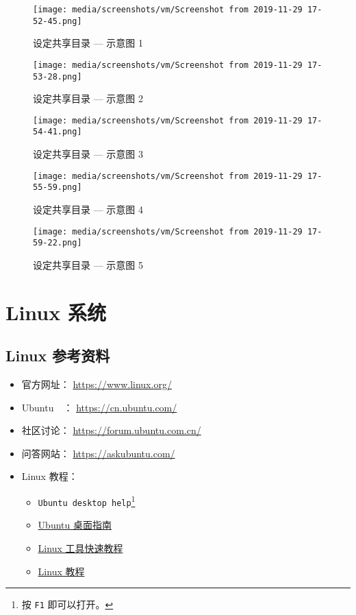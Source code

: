 \documentclass[
    11pt,
    base=hide,
    cite=authoryear,
    device=phone,
    lang=cn,
    mode=simple,
    result=answer,
    toc=onecol,
]{elegantbook_sierxue}
\begin{document}
\begin{figure}[!htbp]
  \centering
  \texttt{[image: media/screenshots/vm/Screenshot from 2019-11-29 17-52-45.png]}
  \caption{设定共享目录 --- 示意图 1}
\end{figure}
\begin{figure}[!htbp]
  \centering
  \texttt{[image: media/screenshots/vm/Screenshot from 2019-11-29 17-53-28.png]}
  \caption{设定共享目录 --- 示意图 2}
\end{figure}
\begin{figure}[!htbp]
  \centering
  \texttt{[image: media/screenshots/vm/Screenshot from 2019-11-29 17-54-41.png]}
  \caption{设定共享目录 --- 示意图 3}
\end{figure}
\begin{figure}[!htbp]
  \centering
  \texttt{[image: media/screenshots/vm/Screenshot from 2019-11-29 17-55-59.png]}
  \caption{设定共享目录 --- 示意图 4}
\end{figure}
\begin{figure}[!htbp]
  \centering
  \texttt{[image: media/screenshots/vm/Screenshot from 2019-11-29 17-59-22.png]}
  \caption{设定共享目录 --- 示意图 5}
\end{figure}

\section{Linux 系统}%
\label{sec:linux-a}

\subsection{Linux 参考资料}%
\label{sub:linux-refs}

\begin{itemize}
    \item 官方网址： \href{https://www.linux.org/}{https://www.linux.org/}
    \item Ubuntu~~： \href{https://cn.ubuntu.com/}{https://cn.ubuntu.com/}
    \item 社区讨论：
        \href{https://forum.ubuntu.com.cn/}{https://forum.ubuntu.com.cn/}
    \item 问答网站：
        \href{https://askubuntu.com/}{https://askubuntu.com/}
    \item Linux 教程：
        \begin{itemize}
            \item \lstinline{Ubuntu desktop help}\footnote{
                按 \lstinline{F1} 即可以打开。}
            \item \href{https://help.ubuntu.com/lts/ubuntu-help/index.html}
                {Ubuntu 桌面指南}
            \item \href{https://linuxtools-rst.readthedocs.io/zh_CN/latest/}
                {Linux 工具快速教程}
            \item \href{https://dunwu.github.io/linux-tutorial/#/}
                {Linux 教程}
        \end{itemize}
\end{itemize}
\end{document}
